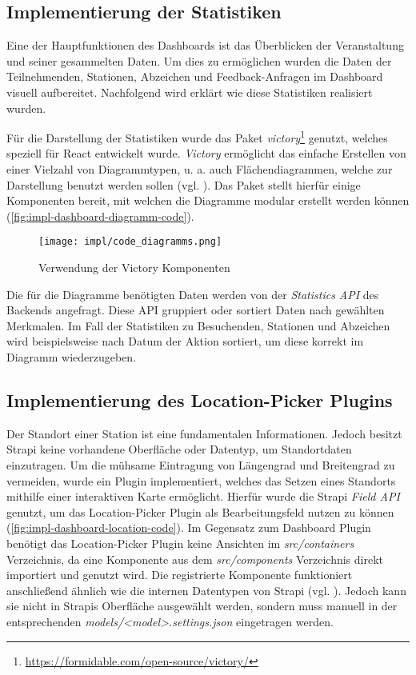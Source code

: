 \subsection{Implementierung der Statistiken}

Eine der Hauptfunktionen des Dashboards ist das Überblicken der Veranstaltung
und seiner gesammelten Daten. Um dies zu ermöglichen wurden die Daten der
Teilnehmenden, Stationen, Abzeichen und Feedback-Anfragen im Dashboard visuell
aufbereitet. Nachfolgend wird erklärt wie diese Statistiken realisiert wurden.

Für die Darstellung der Statistiken wurde das Paket
\textit{victory}\footnote{\url{https://formidable.com/open-source/victory/}}
genutzt, welches speziell für React entwickelt wurde. \textit{Victory}
ermöglicht das einfache Erstellen von einer Vielzahl von Diagrammtypen, u. a.
auch Flächendiagrammen, welche zur Darstellung benutzt werden sollen (vgl.
). Das Paket stellt hierfür einige Komponenten bereit,
mit welchen die Diagramme modular erstellt werden können (\autoref{fig:impl-dashboard-diagramm-code}).

\begin{figure}[htpb]
    \centering
    \texttt{[image: impl/code\_diagramms.png]}
    \caption{Verwendung der Victory Komponenten}
    \label{fig:impl-dashboard-diagramm-code}
\end{figure}

Die für die Diagramme benötigten Daten werden von der \textit{Statistics API}
des Backends angefragt. Diese API gruppiert oder sortiert Daten nach gewählten
Merkmalen. Im Fall der Statistiken zu Besuchenden, Stationen und Abzeichen wird
beispielsweise nach Datum der Aktion sortiert, um diese korrekt im Diagramm
wiederzugeben.

\subsection{Implementierung des Location-Picker Plugins} \label{ssec:impl-dashboard-location-plugin}

Der Standort einer Station ist eine fundamentalen Informationen. Jedoch besitzt
Strapi keine vorhandene Oberfläche oder Datentyp, um Standortdaten einzutragen.
Um die mühsame Eintragung von Längengrad und Breitengrad zu vermeiden, wurde ein
Plugin implementiert, welches das Setzen eines Standorts mithilfe einer
interaktiven Karte ermöglicht. Hierfür wurde die Strapi \textit{Field API}
genutzt, um das Location-Picker Plugin als Bearbeitungsfeld nutzen zu können
(\autoref{fig:impl-dashboard-location-code}). Im Gegensatz zum Dashboard Plugin
benötigt das Location-Picker Plugin keine Ansichten im \textit{src/containers}
Verzeichnis, da eine Komponente aus dem \textit{src/components} Verzeichnis
direkt importiert und genutzt wird. Die registrierte Komponente funktioniert
anschließend ähnlich wie die internen Datentypen von Strapi (vgl.
). Jedoch kann sie nicht in Strapis
Oberfläche ausgewählt werden, sondern muss manuell in der entsprechenden
\textit{models/<model>.settings.json} eingetragen werden.

